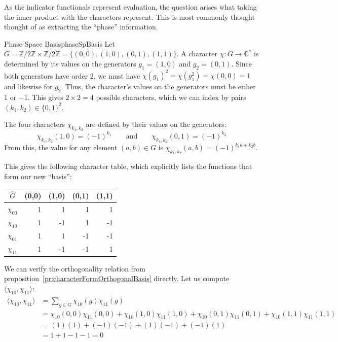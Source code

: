 \documentclass{article}
\newcommand{\C}{{\mathbb{C}}}
\newcommand{\Z}{{\mathbb{Z}}}
\begin{document}
As the indicator functionals represent evaluation, the question arises what taking the inner product with the
characters represent. This is most commonly thought thought of as extracting the ``phase'' information.
\begin{example}{Phase-Space Basis}{phaseSpBasis}
Let $G = \Z/2\Z \times \Z/2\Z = \{(0,0), (1,0), (0,1), (1,1)\}$. A character $\chi: G \to \C^*$ is determined by its values on the generators $g_1=(1,0)$ and $g_2=(0,1)$. Since both generators have order 2, we must have $\chi(g_1)^2 = \chi(g_1^2) = \chi(0,0) = 1$ and likewise for $g_2$. Thus, the character's values on the generators must be either $1$ or $-1$. This gives $2\times 2=4$ possible characters, which we can index by pairs $(k_1, k_2) \in \{0,1\}^2$.

	The four characters $\chi_{k_1, k_2}$ are defined by their values on the generators:
	\[
		\chi_{k_1, k_2}(1,0) = (-1)^{k_1} \qquad \text{and} \qquad \chi_{k_1, k_2}(0,1) = (-1)^{k_2}
	\]
	From this, the value for any element $(a,b) \in G$ is $\chi_{k_1,k_2}(a,b) = (-1)^{k_1a + k_2b}$.

This gives the following character table, which explicitly lists the functions that form our new ``basis'':

\begin{center}
\begin{tabular}{c|rrrr}
	\textbf{$\hat{G}$} & \textbf{(0,0)} & \textbf{(1,0)} & \textbf{(0,1)} & \textbf{(1,1)} \\
	\hline
	$\chi_{00}$ & 1 & 1 & 1 & 1 \\
	$\chi_{10}$ & 1 & -1 & 1 & -1 \\
	$\chi_{01}$ & 1 & 1 & -1 & -1 \\
	$\chi_{11}$ & 1 & -1 & -1 & 1 \\
\end{tabular}
\end{center}

We can verify the orthogonality relation from proposition~\ref{pr:characterFormOrthogonalBasis} directly. Let us
compute $\langle \chi_{10}, \chi_{11} \rangle$:
\begin{align*}
	\langle \chi_{10}, \chi_{11} \rangle &= \sum_{g \in G} \chi_{10}(g)\overline{\chi_{11}(g)} \\
	&= \chi_{10}(0,0)\chi_{11}(0,0) + \chi_{10}(1,0)\chi_{11}(1,0) + \chi_{10}(0,1)\chi_{11}(0,1) + \chi_{10}(1,1)\chi_{11}(1,1) \\
	&= (1)(1) + (-1)(-1) + (1)(-1) + (-1)(1) \\
	&= 1 + 1 - 1 - 1 = 0
\end{align*}
\end{example}
\end{document}

